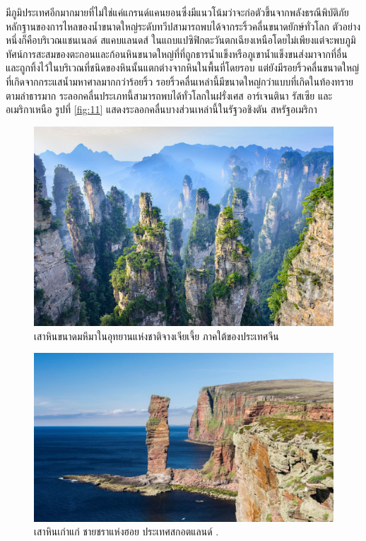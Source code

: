 \documentclass[10pt,twocolumn,letterpaper]{article}
\begin{document}
มีภูมิประเทศอีกมากมายที่ไม่ใช่แค่แกรนด์แคนยอนซึ่งมีแนวโน้มว่าจะก่อตัวขึ้นจากพลังธรณีพิบัติภัย หลักฐานของการไหลของน้ำขนาดใหญ่ระดับทวีปสามารถพบได้จากระริ้วคลื่นขนาดยักษ์ทั่วโลก ตัวอย่างหนึ่งก็คือบริเวณแชนเนลด์ สแคบแลนดส์ ในแถบแปซิฟิกตะวันตกเฉียงเหนือโดยไม่เพียงแต่จะพบภูมิทัศน์การสะสมของตะกอนและก้อนหินขนาดใหญ่ที่ที่ถูกธารน้ำแข็งหรือภูเขาน้ำแข็งขนส่งมาจากที่อื่น และถูกทิ้งไว้ในบริเวณที่ชนิดของหินนั้นแตกต่างจากหินในพื้นที่โดยรอบ แต่ยังมีรอยริ้วคลื่นขนาดใหญ่ที่เกิดจากกระแสน้ำมหาศาลมากกว่าร้อยริ้ว \cite{78,79} รอยริ้วคลื่นเหล่านี้มีขนาดใหญ่กว่าแบบที่เกิดในท้องทรายตามลำธารมาก ระลอกคลื่นประเภทนี้สามารถพบได้ทั่วโลกในฝรั่งเศส อาร์เจนตินา รัสเซีย และอเมริกาเหนือ \cite{81} รูปที่ \ref{fig:11} แสดงระลอกคลื่นบางส่วนเหล่านี้ในรัฐวอชิงตัน สหรัฐอเมริกา \cite{80}

\begin{figure}[b]
\begin{center}
   \includegraphics[width=1\linewidth]{zhangjiajie.jpg}
\end{center}
   \caption{เสาหินขนาดมหึมาในอุทยานแห่งชาติจางเจียเจี้ย ภาคใต้ของประเทศจีน}
\label{fig:12}
\label{fig:onecol}
\end{figure}

\begin{figure}[b]
\begin{center}

   \includegraphics[width=1\linewidth]{hoy.jpg}
\end{center}
   \caption{เสาหินเก่าแก่ ชายชราแห่งฮอย ประเทศสกอตแลนด์ \cite{83}.}
\label{fig:13}
\label{fig:onecol}
\end{figure}
\end{document}
